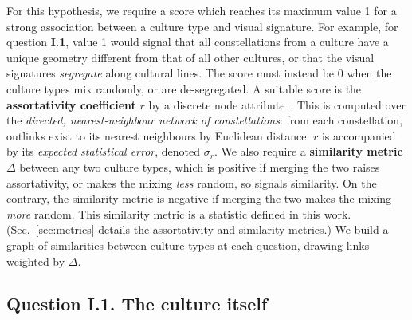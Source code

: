 \documentclass[10pt]{article}
\begin{document}
For this hypothesis, we require a score which reaches its maximum value 1 for a strong association between a culture type and visual signature. For example, for question {\bf I.1}, value 1 would signal that all constellations from a culture have a unique geometry different from that of all other cultures, or that the visual signatures \emph{segregate} along cultural lines. The score must instead be 0 when the culture types mix randomly, or are de-segregated. A suitable score is the {\bf assortativity coefficient} $r$ by a discrete node attribute~\cite{PhysRevE.67.026126}. This is computed over the \emph{directed, nearest-neighbour network of constellations}: from each constellation, outlinks exist to its nearest neighbours by Euclidean distance. $r$ is accompanied by its \emph{expected statistical error}, denoted $\sigma_r$. We also require a {\bf similarity metric} $\Delta$ between any two culture types, which is positive if merging the two raises assortativity, or makes the mixing \emph{less} random, so signals similarity. On the contrary, the similarity metric is negative if merging the two makes the mixing \emph{more} random. This similarity metric is a statistic defined in this work. (Sec.~\ref{sec:metrics} details the assortativity and similarity metrics.) We build a graph of similarities between culture types at each question, drawing links weighted by $\Delta$.

\subsection*{Question I.1. The {\bf culture} itself} %
%
\end{document}
